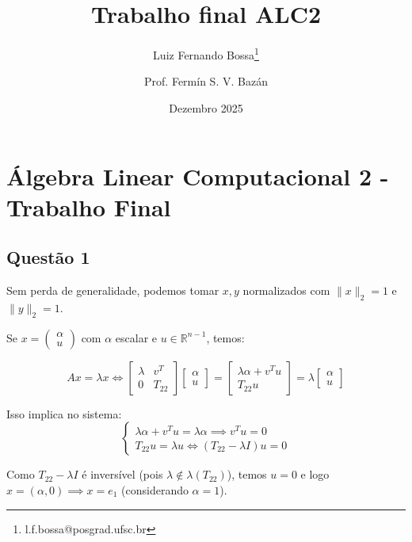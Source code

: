 \documentclass[11pt]{article}
\title{Trabalho final ALC2}
\author{Luiz Fernando Bossa\thanks{l.f.bossa@posgrad.ufsc.br} \and Prof. Fermín S. V. Bazán}
\date{Dezembro 2025}
\begin{document}
    
    \maketitle
    
    

    
    \hypertarget{uxe1lgebra-linear-computacional-2---trabalho-final}{%
\section*{Álgebra Linear Computacional 2 - Trabalho
Final}\label{uxe1lgebra-linear-computacional-2---trabalho-final}}

    \hypertarget{questuxe3o-1}{%
\subsection*{Questão 1}\label{questuxe3o-1}}

    Sem perda de generalidade, podemos tomar \(x, y\) normalizados com
\(\|x\|_2=1\) e \(\|y\|_2=1\).

Se \(x = \begin{pmatrix} \alpha \\ u \end{pmatrix}\) com \(\alpha\)
escalar e \(u \in \mathbb{R}^{n-1}\), temos:

\[Ax = \lambda x \iff \begin{bmatrix} \lambda & v^T \\ 0 & T_{22} \end{bmatrix} \begin{bmatrix} \alpha \\ u \end{bmatrix} = \begin{bmatrix} \lambda \alpha + v^T u \\ T_{22} u \end{bmatrix} = \lambda \begin{bmatrix} \alpha \\ u \end{bmatrix}\]

Isso implica no sistema: \[
\begin{cases}
\lambda \alpha + v^T u = \lambda \alpha \implies v^T u = 0 \\
T_{22} u = \lambda u \iff (T_{22} - \lambda I)u = 0
\end{cases}
\]

Como \(T_{22} - \lambda I\) é inversível (pois
\(\lambda \notin \lambda(T_{22})\)), temos \(u = 0\) e logo
\(x = (\alpha, 0) \implies x = e_1\) (considerando \(\alpha=1\)).
\end{document}
